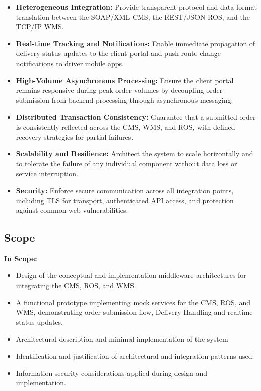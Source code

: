 \begin{itemize}
    \item \textbf{Heterogeneous Integration:} Provide transparent protocol and data format translation between the SOAP/XML CMS, the REST/JSON ROS, and the TCP/IP WMS.
    \item \textbf{Real-time Tracking and Notifications:} Enable immediate propagation of delivery status updates to the client portal and push route-change notifications to driver mobile apps.
    \item \textbf{High-Volume Asynchronous Processing:} Ensure the client portal remains responsive during peak order volumes by decoupling order submission from backend processing through asynchronous messaging.
    \item \textbf{Distributed Transaction Consistency:} Guarantee that a submitted order is consistently reflected across the CMS, WMS, and ROS, with defined recovery strategies for partial failures.
    \item \textbf{Scalability and Resilience:} Architect the system to scale horizontally and to tolerate the failure of any individual component without data loss or service interruption.
    \item \textbf{Security:} Enforce secure communication across all integration points, including TLS for transport, authenticated API access, and protection against common web vulnerabilities.
\end{itemize}

\subsection{Scope}
\textbf{In Scope:}
\begin{itemize}
    \item Design of the conceptual and implementation middleware architectures for integrating the CMS, ROS, and WMS.
    \item A functional prototype implementing mock services for the CMS, ROS, and WMS, demonstrating order submission flow, Delivery Handling and realtime status updates. 
    \item Architectural description and minimal implementation of the system 
    \item Identification and justification of architectural and integration patterns used.
    \item Information security considerations applied during design and implementation.
\end{itemize}

